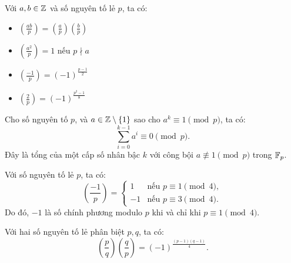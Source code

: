 \documentclass[../imo-training-open-book.tex]{subfiles}
\begin{document}
\vspace{1em}

\begin{theorem}
    \label{theorem:legendre-basic-properties}
    Với \( a, b \in \mathbb Z \) và số nguyên tố lẻ \( p \), ta có:
    \begin{itemize}[topsep=0pt, itemsep=0pt]
        \item \( \left( \frac{ab}{p} \right) = \left( \frac{a}{p} \right)\left( \frac{b}{p} \right) \)
        \item \( \left( \frac{a^2}{p} \right) = 1 \) nếu \( p \nmid a \)
        \item \( \left( \frac{-1}{p} \right) = (-1)^{\frac{p-1}{2}} \)
        \item \( \left( \frac{2}{p} \right) = (-1)^{\frac{p^2 - 1}{8}} \)
    \end{itemize}
\end{theorem}

\vspace{1em}

\begin{theorem}
    \label{theorem:geometric-sum-mod-p}
    Cho số nguyên tố \( p \), và \( a \in \mathbb Z \setminus \{1\} \) sao cho \( a^k \equiv 1 \pmod{p} \), ta có:
    \[
        \sum_{i = 0}^{k - 1} a^i \equiv 0 \pmod{p}.
    \]
    Đây là tổng của một cấp số nhân bậc \( k \) với công bội \( a \not\equiv 1 \pmod{p} \) trong \( \mathbb F_p \).
\end{theorem}

\vspace{1em}

\begin{theorem}
    \label{theorem:square-root-of-minus-one}
    Với số nguyên tố lẻ \( p \), ta có:
    \[
        \left( \frac{-1}{p} \right) = 
        \begin{cases}
            1 & \text{nếu } p \equiv 1 \pmod{4}, \\
            -1 & \text{nếu } p \equiv 3 \pmod{4}.
        \end{cases}
    \]
    Do đó, \( -1 \) là số chính phương modulo \( p \) khi và chỉ khi \( p \equiv 1 \pmod{4} \).
\end{theorem}

\vspace{1em}

\begin{theorem}
    \label{theorem:quadratic-reciprocity}
    Với hai số nguyên tố lẻ phân biệt \( p, q \), ta có:
    \[
        \left( \frac{p}{q} \right) \left( \frac{q}{p} \right) = (-1)^{\frac{(p-1)(q-1)}{4}}.
    \]
\end{theorem}
\end{document}
